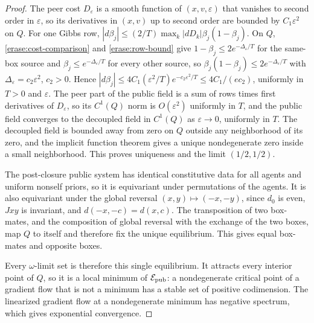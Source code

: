 \begin{proof}
The peer cost $D_\varepsilon$ is a smooth function of $(x,v,\varepsilon)$ that vanishes to second order in $\varepsilon$, so its derivatives in $(x,v)$ up to second order are bounded by $C_1\varepsilon^2$ on $Q$. For one Gibbs row, $|d\beta_j|\leq(2/T)\max_k|dD_k|\beta_j(1-\beta_j)$. On $Q$, \cref{erase:cost-comparison} and \cref{erase:row-bound} give $1-\beta_j\leq2e^{-\Delta_\varepsilon/T}$ for the same-box source and $\beta_j\leq e^{-\Delta_\varepsilon/T}$ for every other source, so $\beta_j(1-\beta_j)\leq2e^{-\Delta_\varepsilon/T}$ with $\Delta_\varepsilon=c_2\varepsilon^2$, $c_2>0$. Hence $|d\beta_j|\leq4C_1(\varepsilon^2/T)e^{-c_2\varepsilon^2/T}\leq4C_1/(ec_2)$, uniformly in $T>0$ and $\varepsilon$. The peer part of the public field is a sum of rows times first derivatives of $D_\varepsilon$, so its $C^1(Q)$ norm is $O(\varepsilon^2)$ uniformly in $T$, and the public field converges to the decoupled field in $C^1(Q)$ as $\varepsilon\to0$, uniformly in $T$. The decoupled field is bounded away from zero on $Q$ outside any neighborhood of its zero, and the implicit function theorem gives a unique nondegenerate zero inside a small neighborhood. This proves uniqueness and the limit $(1/2,1/2)$.

The post-closure public system has identical constitutive data for all agents and uniform nonself priors, so it is equivariant under permutations of the agents. It is also equivariant under the global reversal $(x,y)\mapsto(-x,-y)$, since $d_0$ is even, $Jxy$ is invariant, and $d(-x,-c)=d(x,c)$. The transposition of two box-mates, and the composition of global reversal with the exchange of the two boxes, map $Q$ to itself and therefore fix the unique equilibrium. This gives equal box-mates and opposite boxes.

Every $\omega$-limit set is therefore this single equilibrium. It attracts every interior point of $Q$, so it is a local minimum of $\mathcal E_{\rm pub}$: a nondegenerate critical point of a gradient flow that is not a minimum has a stable set of positive codimension. The linearized gradient flow at a nondegenerate minimum has negative spectrum, which gives exponential convergence.
\end{proof}

